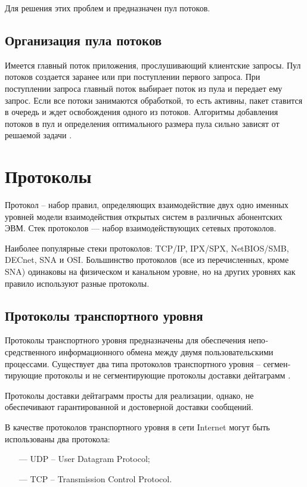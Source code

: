 Для решения этих проблем и предназначен пул потоков.

\subsection{Организация пула потоков}

Имеется главный поток приложения, прослушивающий клиентские запросы. Пул потоков создается заранее или при поступлении первого запроса. При поступлении запроса главный поток выбирает поток из пула и передает ему запрос. Если все потоки занимаются обработкой, то есть активны, пакет ставится в очередь и ждет освобождения одного из потоков. Алгоритмы добавления потоков в пул и определения оптимального размера пула сильно зависят от решаемой задачи \cite{multithread}.

\section{Протоколы}

Протокол -- набор правил, определяющих взаимодействие двух одно­ именных уровней модели взаимодействия открытых систем в различных абонентских ЭВМ. Стек протоколов — набор взаимодействующих сетевых протоколов.

Наиболее популярные стеки протоколов: TCP/IP, IPX/SPX, NetBIOS/SMB, DECnet, SNA и OSI. Большинство протоколов (все из перечисленных, кроме SNA) одинаковы на физическом и канальном уровне, но на других уровнях как правило используют разные протоколы.

\subsection{Протоколы транспортного уровня}

Протоколы транспортного уровня предназначены для обеспечения непо­средственного информационного обмена между двумя пользовательскими процессами. Существует два типа протоколов транспортного уровня – сегмен­тирующие протоколы и не сегментирующие протоколы доставки дейтаграмм \cite{transport-level-protocol}.

Протоколы доставки дейтаграмм просты для реализации, однако, не обеспечивают гарантированной и достоверной доставки сообщений.

В качестве протоколов транспортного уровня в сети Internet могут быть использованы два протокола:

\begin{itemize}
	\item[---] UDP -- User Datagram Protocol;
	\item[---] TCP -- Transmission Control Protocol.
\end{itemize}

